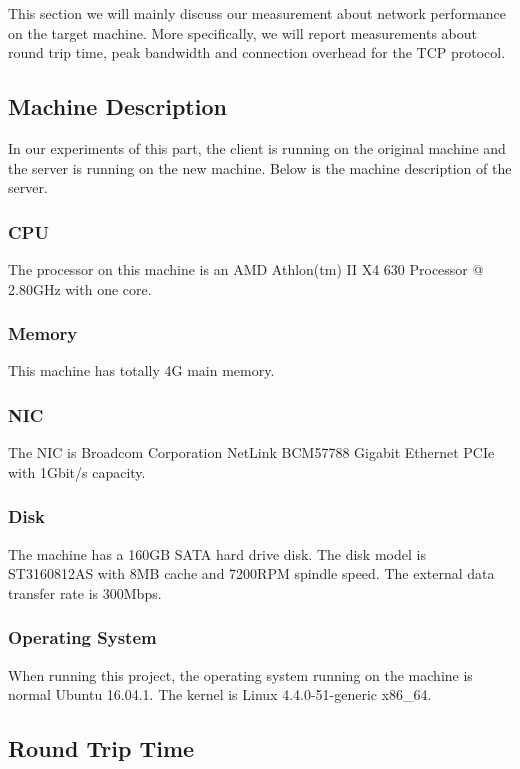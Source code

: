 
% 

This section we will mainly discuss our measurement about network performance on the target machine. More specifically, we will report measurements about round trip time, peak bandwidth and connection overhead for the TCP protocol.

\subsection{Machine Description}
\label{Network_machine_desc}
In our experiments of this part, the client is running on the original machine and the server is running on the new machine. Below is the machine description of the server.

\subsubsection{CPU}

The processor on this machine is an AMD Athlon(tm) II X4 630 Processor @ 2.80GHz with one core.

\subsubsection{Memory}

This machine has totally 4G main memory.

\subsubsection{NIC}

The NIC is Broadcom Corporation NetLink BCM57788 Gigabit Ethernet PCIe with 1Gbit/s capacity.

\subsubsection{Disk}
The machine has a 160GB SATA hard drive disk. The disk model is ST3160812AS with 8MB cache and 7200RPM spindle speed. The external data transfer rate is 300Mbps.

\subsubsection{Operating System}
When running this project, the operating system running on the machine is normal Ubuntu 16.04.1. The kernel is Linux 4.4.0-51-generic x86\_64.

\subsection{Round Trip Time}
\label{Network_rtt}
